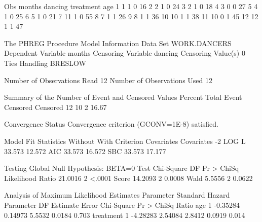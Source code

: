 \documentclass{article}
\begin{document}
\begin{Woutput}
Obs    months    dancing    treatment    age
  1       1         1           0         16
  2       2         1           0         24
  3       2         1           0         18
  4       3         0           0         27
  5       4         1           0         25
  6       5         1           0         21
  7      11         1           0         55
  8       7         1           1         26
  9       8         1           1         36
 10      10         1           1         38
 11      10         0           1         45
 12      12         1           1         47

The PHREG Procedure
          Model Information
Data Set                 WORK.DANCERS
Dependent Variable       months
Censoring Variable       dancing
Censoring Value(s)       0
Ties Handling            BRESLOW

Number of Observations Read          12
Number of Observations Used          12

Summary of the Number of Event and Censored Values
                                     Percent
   Total       Event    Censored    Censored
      12          10           2       16.67

                       Convergence Status
         Convergence criterion (GCONV=1E-8) satisfied.

         Model Fit Statistics
                 Without           With
Criterion     Covariates     Covariates
-2 LOG L          33.573         12.572
AIC               33.573         16.572
SBC               33.573         17.177

        Testing Global Null Hypothesis: BETA=0
Test                 Chi-Square       DF     Pr > ChiSq
Likelihood Ratio        21.0016        2         <.0001
Score                   14.2093        2         0.0008
Wald                     5.5556        2         0.0622

            Analysis of Maximum Likelihood Estimates
              Parameter   Standard                         Hazard
Parameter DF   Estimate      Error Chi-Square Pr > ChiSq    Ratio
age        1   -0.35284    0.14973     5.5532     0.0184    0.703
treatment  1   -4.28283    2.54084     2.8412     0.0919    0.014


\end{Woutput}
\end{document}
